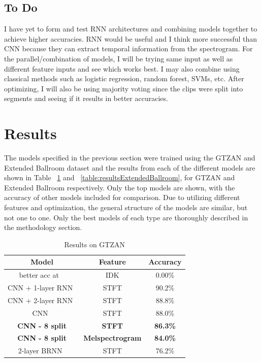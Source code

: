 \documentclass[10pt,twocolumn,letterpaper]{article}
\begin{document}
	\subsection{To Do}
	
	I have yet to form and test RNN architectures and combining models together to achieve higher accuracies. RNN would be useful and I think more successful than CNN because they can extract temporal information from the spectrogram. For the parallel/combination of models, I will be trying same input as well as different feature inputs and see which works best. I may also combine using classical methods such as logistic regression, random forest, SVMs, etc. After optimizing, I will also be using majority voting since the clips were split into segments and seeing if it results in better accuracies.
	
	\section{Results}
	
	The models specified in the previous section were trained using the GTZAN and Extended Ballroom dataset and the results from each of the different models are shown in Table ~\ref{table:resultsGTZAN} and ~\ref{table:resultsExtendedBallroom}, for GTZAN and Extended Ballroom respectively. Only the top models are shown, with the accuracy of other models included for comparison. Due to utilizing different features and optimization, the general structure of the models are similar, but not one to one. Only the best models of each type are thoroughly described in the methodology section.
	
	\begin{table}[!htbp] %
	\caption{Results on GTZAN}
	\centering
		\begin{tabular}[b]{ccc}
			\hline \hline
			Model & Feature & Accuracy 	\\ [0.5ex]
			\hline
			better acc at ~\cite{elbir2020music} & IDK & 0.00\%			\\
			CNN + 1-layer RNN~\cite{yang2020parallel} & STFT & 90.2\%			\\
			CNN + 2-layer RNN~\cite{yang2020parallel} & STFT & 88.8\%			\\
			CNN~\cite{yang2020parallel} & STFT & 88.0\%							\\
			\textbf{CNN - 8 split} & \textbf{STFT} & \textbf{86.3\%} 					\\
			\textbf{CNN - 8 split} & \textbf{Melspectrogram} & \textbf{84.0\%} 			\\
			2-layer BRNN~\cite{schuster1997bidirectional} & STFT & 76.2\% 		\\
			[1ex]
		\end{tabular}
	\label{table:resultsGTZAN}
	\end{table}
\end{document}

